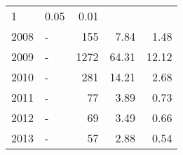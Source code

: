 \begin{longtable}{lXrrr}
       \num{1} &
       \num[round-mode=places,round-precision=2]{0.05} &
         \num[round-mode=places,round-precision=2]{0.01} \\

     2008 &
     \multicolumn{1}{X}{ -  } &


       \num{155} &
       \num[round-mode=places,round-precision=2]{7.84} &
         \num[round-mode=places,round-precision=2]{1.48} \\

     2009 &
     \multicolumn{1}{X}{ -  } &


       \num{1272} &
       \num[round-mode=places,round-precision=2]{64.31} &
         \num[round-mode=places,round-precision=2]{12.12} \\

     2010 &
     \multicolumn{1}{X}{ -  } &


       \num{281} &
       \num[round-mode=places,round-precision=2]{14.21} &
         \num[round-mode=places,round-precision=2]{2.68} \\

     2011 &
     \multicolumn{1}{X}{ -  } &


       \num{77} &
       \num[round-mode=places,round-precision=2]{3.89} &
         \num[round-mode=places,round-precision=2]{0.73} \\

     2012 &
     \multicolumn{1}{X}{ -  } &


       \num{69} &
       \num[round-mode=places,round-precision=2]{3.49} &
         \num[round-mode=places,round-precision=2]{0.66} \\

     2013 &
     \multicolumn{1}{X}{ -  } &


       \num{57} &
       \num[round-mode=places,round-precision=2]{2.88} &
         \num[round-mode=places,round-precision=2]{0.54} \\


\end{longtable}
